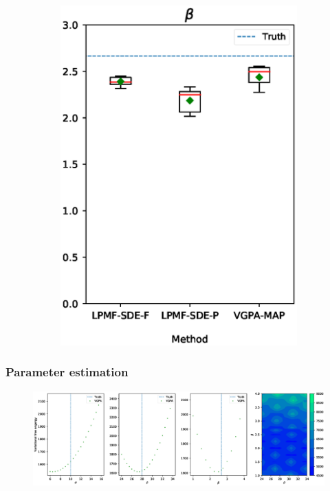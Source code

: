\begin{frame}[t]
\begin{figure}
\begin{subfigure}{0.24\textwidth}
            \includegraphics[width=\linewidth]{graphics/lorenz-63-parameters-beta-boxplot}
            \label{fig-lorenz-63-parameters-beta-boxplot}
        \end{subfigure}
        \label{fig-lorenz-63-parameters-group}
    \end{figure}    
\end{frame}

\begin{frame}[t]
    \frametitle{Parameter estimation}
	\begin{figure}
	    \centering
	    \includegraphics[width=\linewidth]{graphics/lorenz-63-parameters-grid-search}
	    \label{fig-lorenz-63-parameters-grid-search}    
	\end{figure} 
\end{frame}

